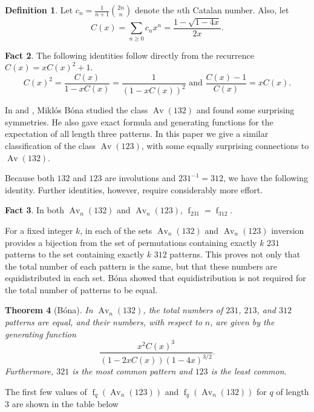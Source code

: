 \documentclass[11pt]{article} %
\theoremstyle{plain}
\newtheorem{theorem}{Theorem}
\theoremstyle{definition}
\newtheorem{definition}[theorem]{Definition}
\newtheorem{fact}[theorem]{Fact}
\newcommand{\Avn}{\Av_n(123)}
\newcommand{\Avnn}{\Av_n (132)}
\DeclareMathOperator{\Av}{Av}
\DeclareMathOperator{\num}{f}
\begin{document}
  \begin{definition}
    Let $c_n = \frac{1}{n+1} \binom{2n}{n}$ denote the $n$th Catalan
    number. Also, let
    $$ C(x) = \sum_{n\geq 0} c_n x^n = \frac{1 - \sqrt{1-4x}}{2x}.$$
  \end{definition}

  \begin{fact}
    The following identities follow directly from the recurrence $C(x) =
    xC(x)^2 +1$.
    $$ C(x)^2 = \frac{C(x)}{1-xC(x)} = \frac{1}{(1-xC(x))^2}
    \text{ \  and \  } \frac{C(x)-1}{C(x)} = xC(x).$$
  \end{fact}

  In \cite{bona10} and \cite{bona12}, Mikl\'os B\'ona studied the
  class $\Av (132)$ and found some surprising symmetries. He also gave
  exact formula and generating functions for the expectation of all
  length three patterns. In this paper we give a similar
  classification of the class $\Av (123)$, with some equally surprising
  connections to $\Av (132)$.

  Because both $132$ and $123$ are involutions and $231^{-1} = 312$,
  we have the following identity. Further identities, however, require
  considerably more effort.

  \begin{fact}
    In both $\Avnn$ and $\Avn$, $\num_{231} = \num_{312}$.
  \end{fact}

  For a fixed integer $k$, in each of the sets $\Avnn$ and $\Avn$
  inversion provides a bijection from the set of permutations
  containing exactly $k$ $231$ patterns to the set containing exactly
  $k$ $312$ patterns. This proves not only that the total number of each
  pattern is the same, but that these numbers are equidistributed in
  each set. B\'ona showed that equidistribution is not required for
  the total number of patterns to be equal.



  \begin{theorem}[B\'ona] \label{bonasthm}
    In $\Avnn $, the total numbers of $231$, $213$, and $312$
    patterns are equal, and their numbers, with respect to $n$,
    are given by the generating function
    $$ \frac{x^2C(x)^3}{(1-2xC(x))(1-4x)^{3/2}}.$$
    Furthermore, $321$ is the most common pattern and $123$ is the
    least common.
  \end{theorem}

  The first few values of $\num_q(\Avn)$ and $\num_q(\Avnn)$ for $q$
  of length $3$ are shown in the table below
\end{document}
